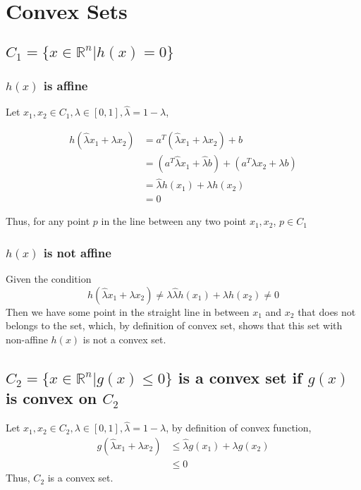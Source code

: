 \section{Convex Sets}

\subsection{$C_1 = \{x \in \mathbb{R}^n | h(x) = 0\}$}\label{prob:hw5-prob2-a}

\subsubsection{$h(x)$ is affine}
Let $x_1, x_2 \in C_1, \lambda \in [0, 1], \hat{\lambda} = 1  - \lambda$,

\begin{align*}
h(\hat{\lambda}x_1 + \lambda x_2) &= a^T(\hat \lambda x_1 + \lambda x_2) + b \\
&= (a^T \hat \lambda x_1 + \hat \lambda b) + (a^T \lambda x_2 + \lambda b) \\
&= \hat \lambda h(x_1) + \lambda h(x_2)\\
&= 0
\end{align*}

Thus, for any point $p$ in the line between any two point $x_1, x_2$, $p \in C_1$

\subsubsection{$h(x)$ is not affine} 
Given the condition
\[
h(\hat \lambda x_1 + \lambda x_2) \neq \lambda \hat \lambda h(x_1) + \lambda h(x_2) \neq 0
\]
Then we have some point in the straight line in between $x_1$ and $x_2$ that does not belongs to the set, which, by definition of convex set, shows that this set with non-affine $h(x)$ is not a convex set.  

\subsection{$C_2=\{x \in \mathbb{R}^n | g(x)\leq 0\}$ is a convex set if $g(x)$ is convex on $C_2$} \label{prob:hw5-prob2-b}
Let $x_1, x_2 \in C_2, \lambda \in [0, 1], \hat{\lambda} = 1  - \lambda$, by definition of convex function, 
\begin{align*}
g(\hat \lambda x_1 + \lambda x_2 ) &\leq \hat \lambda g(x_1) + \lambda g(x_2) \\
&\leq 0
\end{align*}
Thus, $C_2$ is a convex set.


